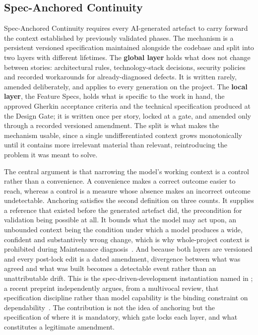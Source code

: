 \subsection{Spec-Anchored Continuity}
\label{sec:spec_anchored}
Spec-Anchored Continuity requires every AI-generated artefact to carry forward the context established by previously validated phases. The mechanism is a persistent versioned specification maintained alongside the codebase and split into two layers with different lifetimes. The \textbf{global layer} holds what does not change between stories: architectural rules, technology-stack decisions, security policies and recorded workarounds for already-diagnosed defects. It is written rarely, amended deliberately, and applies to every generation on the project. The \textbf{local layer}, the Feature Specs, holds what is specific to the work in hand, the approved Gherkin acceptance criteria and the technical specification produced at the Design Gate; it is written once per story, locked at a gate, and amended only through a recorded versioned amendment. The split is what makes the mechanism usable, since a single undifferentiated context grows monotonically until it contains more irrelevant material than relevant, reintroducing the problem it was meant to solve.

The central argument is that narrowing the model's working context is a control rather than a convenience. A convenience makes a correct outcome easier to reach, whereas a control is a measure whose absence makes an incorrect outcome undetectable. Anchoring satisfies the second definition on three counts. It supplies a reference that existed before the generated artefact did, the precondition for validation being possible at all. It bounds what the model may act upon, an unbounded context being the condition under which a model produces a wide, confident and substantively wrong change, which is why whole-project context is prohibited during Maintenance diagnosis~\cite{Zhao:2025vibe}. And because both layers are versioned and every post-lock edit is a dated amendment, divergence between what was agreed and what was built becomes a detectable event rather than an unattributable drift. This is the spec-driven-development instantiation named in ; a recent preprint independently argues, from a multivocal review, that specification discipline rather than model capability is the binding constraint on dependability~\cite{Farrag:2026sd}. The contribution is not the idea of anchoring but the specification of where it is mandatory, which gate locks each layer, and what constitutes a legitimate amendment.

